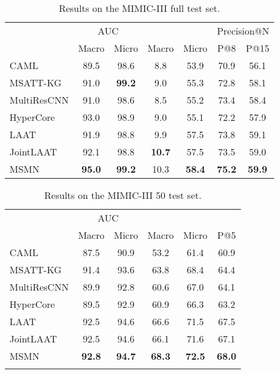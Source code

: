 \documentclass[11pt]{article}
\begin{document}
\begin{table*}[h]
    \small 
    \centering
    \begin{tabular}{lcccccc}
    \toprule
    & \multicolumn{2}{c}{AUC}  & \multicolumn{2}{c}{} & \multicolumn{2}{c}{Precision@N}\\
    & Macro & Micro & Macro & Micro & P@8 & P@15 \\
    \midrule
    CAML \cite{mullenbach-etal-2018-explainable} & 89.5 & 98.6 & 8.8 & 53.9 &  70.9 & 56.1 \\
    MSATT-KG \cite{xie2019ehr} & 91.0 & \textbf{99.2} & 9.0 & 55.3  & 72.8 & 58.1 \\
    MultiResCNN \cite{li2020icd} & 91.0 & 98.6 & 8.5 & 55.2  & 73.4 & 58.4 \\
    HyperCore \cite{cao2020hypercore} & 93.0 & 98.9 & 9.0 & 55.1  & 72.2 & 57.9 \\
    LAAT \cite{ijcai2020-461-vu} & 91.9 & 98.8 & 9.9 & 57.5  & 73.8 & 59.1 \\
    JointLAAT \cite{ijcai2020-461-vu} & 92.1 & 98.8 & \textbf{10.7} & 57.5  & 73.5 & 59.0  \\
\midrule
MSMN & \textbf{95.0} & \textbf{99.2}& 10.3& \textbf{58.4} & \textbf{75.2}& \textbf{59.9} \\
\bottomrule
    \end{tabular}
    \caption{Results on the MIMIC-III full test set.}
    \label{tab:full}
\end{table*}

\begin{table}
    \small 
    \centering
    \begin{tabular}{p{1.58cm}ccccc}
    \toprule
    & \multicolumn{2}{c}{AUC}  & \multicolumn{2}{c}{} &\\
     & Macro & Micro & Macro & Micro & P@5 \\
    \midrule
    CAML & 87.5 & 90.9 & 53.2 & 61.4 & 60.9 \\
    MSATT-KG & 91.4 & 93.6 & 63.8 & 68.4 & 64.4  \\
    MultiResCNN & 89.9 & 92.8 & 60.6 & 67.0 & 64.1 \\
    HyperCore & 89.5 & 92.9 & 60.9 & 66.3 & 63.2  \\
    LAAT & 92.5 & 94.6 & 66.6 & 71.5 & 67.5  \\
    JointLAAT & 92.5 & 94.6 & 66.1 & 71.6 & 67.1\\
\hline
MSMN & \textbf{92.8} & \textbf{94.7} & \textbf{68.3} & \textbf{72.5} & \textbf{68.0} \\
    \bottomrule \\
    \end{tabular}
    \caption{Results on the MIMIC-III 50 test set.}
    \label{tab:50}
\end{table}
\end{document}
